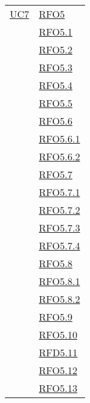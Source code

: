 \begin{longtable}{|>{\centering}m{5cm}|m{5cm}<{\centering}|}
\hyperlink{UC7}{UC7} 
& \hyperlink{RFO5}{RFO5}\\
& \hyperlink{RFO5.1}{RFO5.1}\\
& \hyperlink{RFO5.2}{RFO5.2}\\
& \hyperlink{RFO5.3}{RFO5.3}\\
& \hyperlink{RFO5.4}{RFO5.4}\\
& \hyperlink{RFO5.5}{RFO5.5}\\
& \hyperlink{RFO5.6}{RFO5.6}\\
& \hyperlink{RFO5.6.1}{RFO5.6.1}\\
& \hyperlink{RFO5.6.2}{RFO5.6.2}\\
& \hyperlink{RFO5.7}{RFO5.7}\\
& \hyperlink{RFO5.7.1}{RFO5.7.1}\\
& \hyperlink{RFO5.7.2}{RFO5.7.2}\\
& \hyperlink{RFO5.7.3}{RFO5.7.3}\\
& \hyperlink{RFO5.7.4}{RFO5.7.4}\\
& \hyperlink{RFO5.8}{RFO5.8}\\
& \hyperlink{RFO5.8.1}{RFO5.8.1}\\
& \hyperlink{RFO5.8.2}{RFO5.8.2}\\
& \hyperlink{RFO5.9}{RFO5.9}\\
& \hyperlink{RFO5.10}{RFO5.10}\\
& \hyperlink{RFD5.11}{RFD5.11}\\
& \hyperlink{RFO5.12}{RFO5.12}\\
& \hyperlink{RFO5.13}{RFO5.13}\\\hline


\end{longtable}
